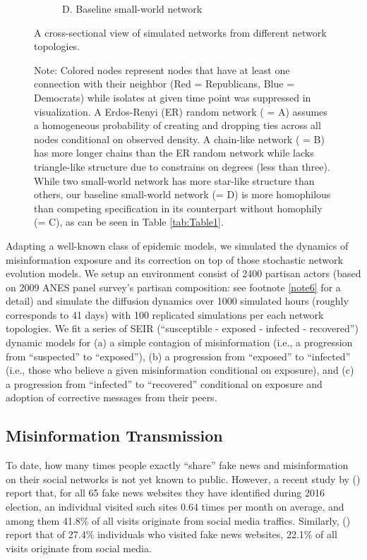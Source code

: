 \documentclass[man, 12pt, a4paper, nolmodern, noextraspace]{apa6}
\begin{document}
\begin{figure}
\begin{subfigure}[t]{0.45\textwidth}
        \caption*{D. Baseline small-world network} \label{fig1:smallworld}
    \end{subfigure}
    
    \vspace{1cm}
    \captionsetup{format=hang}
    \caption{A cross-sectional view of simulated networks from different network topologies.} 
    \label{fig:Figure1}
    \captionsetup{font=small}
    \caption*{Note: Colored nodes represent nodes that have at least one connection with their neighbor (Red = Republicans, Blue = Democrats) while isolates at given time point was suppressed in visualization. A Erdos-Renyi (ER) random network ( = A) assumes a homogeneous probability of creating and dropping ties across all nodes conditional on observed density. A chain-like network ( = B) has more longer chains than the ER random network while lacks triangle-like structure due to constrains on degrees (less than three). While two small-world network has more star-like structure than others, our baseline small-world network (= D) is more homophilous than competing specification in its counterpart without homophily (= C), as can be seen in Table \ref{tab:Table1}.} 
\end{figure}    

	Adapting a well-known class of epidemic models, we simulated the dynamics of misinformation exposure and its correction on top of those stochastic network evolution models. We setup an environment consist of 2400 partisan actors (based on 2009 ANES panel survey's partisan composition: see footnote \ref{note6} for a detail) and simulate the diffusion dynamics over 1000 simulated hours (roughly corresponds to 41 days) with 100 replicated simulations per each network topologies. We fit a series of SEIR (\enquote{susceptible - exposed - infected - recovered}) dynamic models for (a) a simple contagion of misinformation (i.e., a progression from \enquote{suspected} to \enquote{exposed}), (b) a progression from \enquote{exposed} to \enquote{infected} (i.e., those who believe a given misinformation conditional on exposure), and (c) a progression from \enquote{infected} to \enquote{recovered} conditional on exposure and adoption of corrective messages from their peers. 

\subsection{Misinformation Transmission}
    
    To date, how many times people exactly \enquote{share} fake news and misinformation on their social networks is not yet known to public. However, a recent study by \citeauthor{allcott2017social} (\citeyear{allcott2017social}) report that, for all 65 fake news websites they have identified during 2016 election, an individual visited such sites 0.64 times per month on average, and among them 41.8\% of all visits originate from social media traffics. Similarly, \citeauthor{guess2018selective} (\citeyear{guess2018selective}) report that of 27.4\% individuals who visited fake news websites, 22.1\% of all visits originate from social media. 
\end{document}
